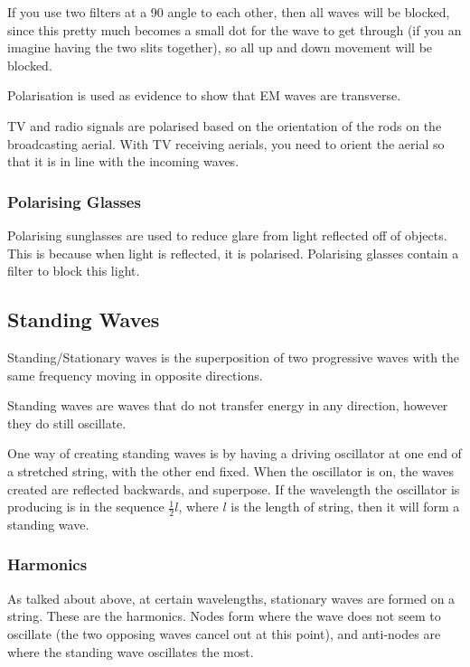 \documentclass[a4paper, 12pt]{article}
\begin{document}
If you use two filters at a 90{\textdegree} angle to each other, then all waves will be blocked, since this pretty much becomes a small dot for the wave to get through (if you an imagine having the two slits together), so all up and down movement will be blocked.

Polarisation is used as evidence to show that EM waves are transverse.

TV and radio signals are polarised based on the orientation of the rods on the broadcasting aerial. With TV receiving aerials, you need to orient the aerial so that it is in line with the incoming waves.

\subsubsection{Polarising Glasses}

Polarising sunglasses are used to reduce glare from light reflected off of objects. This is because when light is reflected, it is polarised. Polarising glasses contain a filter to block this light.

\subsection{Standing Waves}

Standing/Stationary waves is the superposition of two progressive waves with the same frequency moving in opposite directions.

Standing waves are waves that do not transfer energy in any direction, however they do still oscillate.

One way of creating standing waves is by having a driving oscillator at one end of a stretched string, with the other end fixed. When the oscillator is on, the waves created are reflected backwards, and superpose. If the wavelength the oscillator is producing is in the sequence $\frac{1}{2} l$, where $l$ is the length of string, then it will form a standing wave.

\subsubsection{Harmonics}

As talked about above, at certain wavelengths, stationary waves are formed on a string.
These are the harmonics. Nodes form where the wave does not seem to oscillate (the two opposing waves cancel out at this point), and anti-nodes are where the standing wave oscillates the most.
\end{document}
